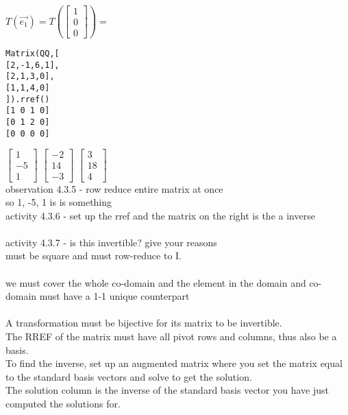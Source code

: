 \documentclass{article}
\begin{document}
$T(\vec{e_1}) = T\left(\begin{bmatrix} 1\\0\\0 \end{bmatrix}\right) = $

\begin{verbatim}
Matrix(QQ,[ 
[2,-1,6,1],
[2,1,3,0],
[1,1,4,0]
]).rref()
[1 0 1 0]
[0 1 2 0]
[0 0 0 0]
\end{verbatim}

$\begin{bmatrix} 1 \\ -5 \\1\end{bmatrix}$
$\begin{bmatrix} -2 \\ 14 \\-3\end{bmatrix}$
$\begin{bmatrix} 3 \\ 18 \\4\end{bmatrix}$
\\
observation 4.3.5 - row reduce entire matrix at once \\
so 1, -5, 1 is is something 
\\
activity 4.3.6 - set up the rref and the matrix on the right is the a inverse\\
\\
activity 4.3.7  - is this invertible? give your reasons\\
must be square and must row-reduce to I.\\
\\
we must cover the whole co-domain and the element in the domain and co-domain must have a 1-1 unique counterpart\\
\\
A transformation must be bijective for its matrix to be invertible.\\
The RREF of the matrix must have all pivot rows and columns, thus also be a basis.\\
To find the inverse, set up an augmented matrix where you set the matrix equal to the standard basis vectors and solve to get the solution.\\
The solution column is the inverse of the standard basis vector you have just computed the solutions for.\\
\end{document}
